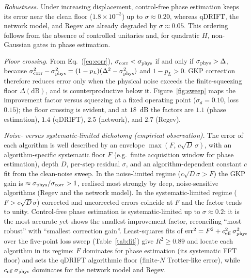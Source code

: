 \documentclass[10pt]{iopart}
\begin{document}
\emph{Robustness.} Under increasing displacement, control-free phase estimation
keeps its error near the clean floor ($1.8\times10^{-3}$) up to
$\sigma\!\approx\!0.20$, whereas qDRIFT, the network model, and Regev are
already degraded by $\sigma\!\approx\!0.05$. This ordering follows from the
absence of controlled unitaries and, for quadratic $H$, non-Gaussian gates in
phase estimation.

\emph{Floor crossing.} From Eq.~(\ref{eq:corr}),
$\sigma_{\rm corr}<\sigma_{\rm phys}$ if and only if
$\sigma_{\rm phys}>\Delta$, because $\sigma_{\rm corr}^2-\sigma_{\rm phys}^2
=(1-p_L)(\Delta^2-\sigma_{\rm phys}^2)$ and $1-p_L>0$. GKP correction therefore
reduces error only when the physical noise exceeds the finite-squeezing floor
$\Delta(\mathrm{dB})$, and is counterproductive below it. Figure~\ref{fig:sweep}
maps the improvement factor versus squeezing at a fixed operating point
($\sigma_d=0.10$, loss $0.15$); the floor crossing is evident, and at $18$~dB
the factors are $1.1$ (phase estimation), $1.4$ (qDRIFT), $2.5$ (network), and
$2.7$ (Regev).

\emph{Noise- versus systematic-limited dichotomy (empirical observation).}
The error of each algorithm is well described by an envelope
$\max(F,\,c\sqrt{D}\,\sigma)$, with an algorithm-specific systematic floor $F$
(e.g.\ finite acquisition window for phase estimation), depth $D$, per-step
residual $\sigma$, and an algorithm-dependent constant $c$ fit from the
clean-noise sweep. In the noise-limited regime ($c\sqrt D\sigma>F$) the GKP
gain is $\approx\sigma_{\rm phys}/\sigma_{\rm corr}>1$, realised most strongly
by deep, noise-sensitive algorithms (Regev and the network model). In the
systematic-limited regime ($F>c\sqrt D\sigma$) corrected and uncorrected
errors coincide at $F$ and the factor tends to unity. Control-free phase
estimation is systematic-limited up to $\sigma\!\approx\!0.2$: it is the most
accurate yet shows the smallest improvement factor, reconciling ``most robust''
with ``smallest correction gain''. Least-squares fits of
$\mathrm{err}^2=F^2+c_{\rm eff}^2\,\sigma_{\rm phys}^2$ over the five-point loss
sweep (Table~\ref{tab:fit}) give $R^2\!\ge\!0.89$ and locate each algorithm in
its regime: $F$ dominates for phase estimation (its systematic FFT floor) and
sets the qDRIFT algorithmic floor (finite-$N$ Trotter-like error), while
$c_{\rm eff}\,\sigma_{\rm phys}$ dominates for the network model and Regev.
\end{document}
